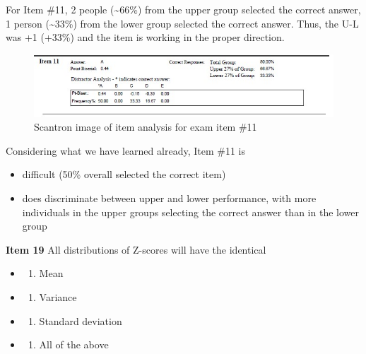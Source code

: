 \documentclass[
  english,
]{book}
\providecommand{\tightlist}{%
  \setlength{\itemsep}{0pt}\setlength{\parskip}{0pt}}
\begin{document}
For Item \#11, 2 people (\textasciitilde66\%) from the upper group selected the correct answer, 1 person (\textasciitilde33\%) from the lower group selected the correct answer. Thus, the U-L was +1 (+33\%) and the item is working in the proper direction.

\begin{figure}
\centering
\includegraphics{images/ItemAnalExam/Item11.jpg}
\caption{Scantron image of item analysis for exam item \#11}
\end{figure}

Considering what we have learned already, Item \#11 is

\begin{itemize}
\tightlist
\item
  difficult (50\% overall selected the correct item)
\item
  does discriminate between upper and lower performance, with more individuals in the upper groups selecting the correct answer than in the lower group
\end{itemize}

\textbf{Item 19} All distributions of Z-scores will have the identical

\begin{itemize}
\item
  \begin{enumerate}
  \def\labelenumi{\alph{enumi})}
  \tightlist
  \item
    Mean
  \end{enumerate}
\item
  \begin{enumerate}
  \def\labelenumi{\alph{enumi})}
  \setcounter{enumi}{1}
  \tightlist
  \item
    Variance
  \end{enumerate}
\item
  \begin{enumerate}
  \def\labelenumi{\alph{enumi})}
  \setcounter{enumi}{2}
  \tightlist
  \item
    Standard deviation
  \end{enumerate}
\item
  \begin{enumerate}
  \def\labelenumi{\alph{enumi})}
  \setcounter{enumi}{3}
  \tightlist
  \item
    All of the above
  \end{enumerate}
\end{itemize}
\end{document}
